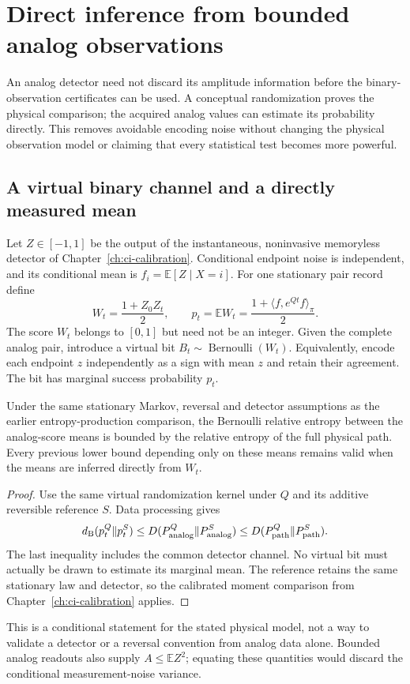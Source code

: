\chapter{Direct inference from bounded analog observations}
\label{ch:ci-analog}

An analog detector need not discard its amplitude information before the
binary-observation certificates can be used. A conceptual randomization proves
the physical comparison; the acquired analog values can estimate its probability
directly. This removes avoidable encoding noise without changing the physical
observation model or claiming that every statistical test becomes more powerful.

\section{A virtual binary channel and a directly measured mean}
Let $Z\in[-1,1]$ be the output of the instantaneous, noninvasive memoryless
detector of Chapter~\ref{ch:ci-calibration}. Conditional endpoint noise is
independent, and its conditional mean is $f_i=\mathbb E[Z\mid X=i]$. For one
stationary pair record define
\begin{equation}
 W_t=\frac{1+Z_0Z_t}{2},\qquad
 p_t=\mathbb E W_t=\frac{1+\langle f,e^{Qt}f\rangle_\pi}{2}.
 \label{eq:ci-analog-score}
\end{equation}
The score $W_t$ belongs to $[0,1]$ but need not be an integer. Given the complete
analog pair, introduce a virtual bit $B_t\sim\operatorname{Bernoulli}(W_t)$.
Equivalently, encode each endpoint $z$ independently as a sign with mean $z$
and retain their agreement. The bit has marginal success probability $p_t$.

\begin{proposition}
Under the same stationary Markov, reversal and detector assumptions as the
earlier entropy-production comparison, the Bernoulli relative entropy between
the analog-score means is bounded by the relative entropy of the full physical
path. Every previous lower bound depending only on these means remains valid
when the means are inferred directly from $W_t$.
\end{proposition}
\begin{proof}
Use the same virtual randomization kernel under $Q$ and its additive reversible
reference $S$. Data processing gives
\[
 d_{\rm B}(p_t^Q\Vert p_t^S)
 \leq D(P_{\rm analog}^Q\Vert P_{\rm analog}^S)
 \leq D(P_{\rm path}^Q\Vert P_{\rm path}^S).
\]
The last inequality includes the common detector channel. No virtual bit must
actually be drawn to estimate its marginal mean. The reference retains the
same stationary law and detector, so the calibrated moment comparison from
Chapter~\ref{ch:ci-calibration} applies.
\end{proof}
This is a conditional statement for the stated physical model, not a way to
validate a detector or a reversal convention from analog data alone. Bounded
analog readouts also supply $A\leq\mathbb E Z^2$; equating these quantities
would discard the conditional measurement-noise variance.

